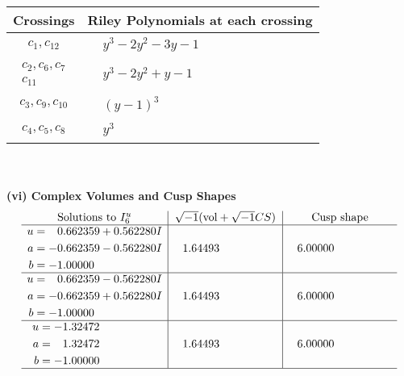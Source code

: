 \documentclass[1p]{elsarticle_modified}
\theoremstyle{definition}
\newcommand{\I}{\sqrt{-1}}
\begin{document}
\begin{tabular}{m{50pt}|m{274pt}}
Crossings & \hspace{64pt}Riley Polynomials at each crossing \\
\hline $$\begin{aligned}c_{1},c_{12}\end{aligned}$$&$\begin{aligned}
&y^3-2 y^2-3 y-1
\end{aligned}$\\
\hline $$\begin{aligned}c_{2},c_{6},c_{7}\\c_{11}\end{aligned}$$&$\begin{aligned}
&y^3-2 y^2+y-1
\end{aligned}$\\
\hline $$\begin{aligned}c_{3},c_{9},c_{10}\end{aligned}$$&$\begin{aligned}
&(y-1)^3
\end{aligned}$\\
\hline $$\begin{aligned}c_{4},c_{5},c_{8}\end{aligned}$$&$\begin{aligned}
&y^3
\end{aligned}$\\
\hline
\end{tabular}\\~\\
\newpage\flushleft \textbf{(vi) Complex Volumes and Cusp Shapes}
$$\begin{array}{c|c|c}  
\text{Solutions to }I^u_{6}& \I (\text{vol} + \sqrt{-1}CS) & \text{Cusp shape}\\
 \hline 
\begin{aligned}
u &= \phantom{-}0.662359 + 0.562280 I \\
a &= -0.662359 - 0.562280 I \\
b &= -1.00000\phantom{ +0.000000I}\end{aligned}
 & \phantom{-}1.64493\phantom{ +0.000000I} & \phantom{-}6.00000\phantom{ +0.000000I} \\ \hline\begin{aligned}
u &= \phantom{-}0.662359 - 0.562280 I \\
a &= -0.662359 + 0.562280 I \\
b &= -1.00000\phantom{ +0.000000I}\end{aligned}
 & \phantom{-}1.64493\phantom{ +0.000000I} & \phantom{-}6.00000\phantom{ +0.000000I} \\ \hline\begin{aligned}
u &= -1.32472\phantom{ +0.000000I} \\
a &= \phantom{-}1.32472\phantom{ +0.000000I} \\
b &= -1.00000\phantom{ +0.000000I}\end{aligned}
 & \phantom{-}1.64493\phantom{ +0.000000I} & \phantom{-}6.00000\phantom{ +0.000000I}\\
 \hline 
 \end{array}$$\newpage\newpage\renewcommand{\arraystretch}{1}
\end{document}
